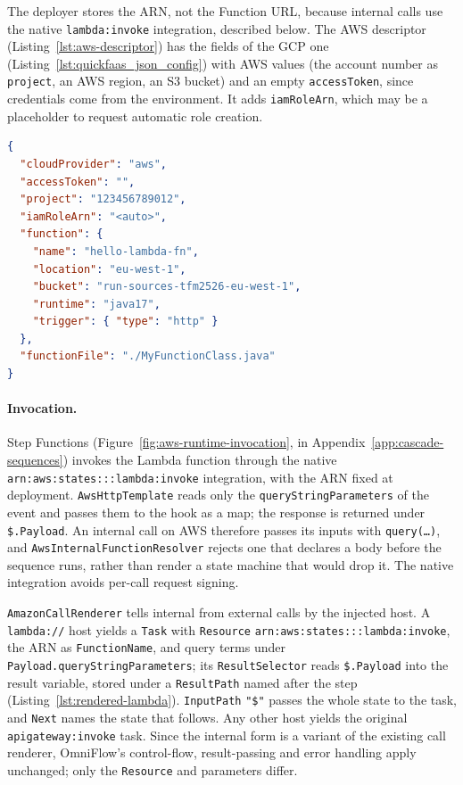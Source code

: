 The deployer stores the ARN, not the Function URL, because internal calls use the native
\texttt{lambda:invoke} integration, described below. The AWS descriptor
(Listing~\ref{lst:aws-descriptor}) has the fields of the GCP one
(Listing~\ref{lst:quickfaas_json_config}) with AWS values (the account number as
\texttt{project}, an AWS region, an S3 bucket) and an empty \texttt{accessToken}, since credentials
come from the environment. It adds \texttt{iamRoleArn}, which may be a placeholder to request
automatic role creation.

\begin{lstlisting}[language=json,caption={Minimal AWS deployment descriptor for an internal function.},label={lst:aws-descriptor}]
{
  "cloudProvider": "aws",
  "accessToken": "",
  "project": "123456789012",
  "iamRoleArn": "<auto>",
  "function": {
    "name": "hello-lambda-fn",
    "location": "eu-west-1",
    "bucket": "run-sources-tfm2526-eu-west-1",
    "runtime": "java17",
    "trigger": { "type": "http" }
  },
  "functionFile": "./MyFunctionClass.java"
}
\end{lstlisting}

\paragraph{Invocation.}
\label{sec:runtime-invocation}
Step Functions (Figure~\ref{fig:aws-runtime-invocation}, in Appendix~\ref{app:cascade-sequences})
invokes the Lambda function
through the native \texttt{arn:\allowbreak aws:\allowbreak states:::\allowbreak lambda:\allowbreak invoke} integration, with the ARN fixed at
deployment. \texttt{AwsHttpTemplate} reads only the \texttt{query\allowbreak String\allowbreak Parameters} of the event and
passes them to the hook as a map; the response is returned under \texttt{\$.Payload}. An internal
call on AWS therefore passes its inputs with \texttt{query(\ldots)}, and
\texttt{Aws\allowbreak Internal\allowbreak Function\allowbreak Resolver} rejects one that declares a
body before the sequence runs, rather than render a state machine that would drop it. The native
integration avoids per-call request signing.

\texttt{AmazonCall\allowbreak Renderer} tells internal from external calls by the injected host. A
\texttt{lambda://} host yields a \texttt{Task} with \texttt{Resource}
\texttt{arn:aws:states:::lambda:invoke}, the ARN as \texttt{FunctionName}, and query terms under
\texttt{Payload.queryStringParameters}; its \texttt{ResultSelector} reads \texttt{\$.Payload} into
the result variable, stored under a \texttt{ResultPath} named after the step
(Listing~\ref{lst:rendered-lambda}). \texttt{InputPath} \texttt{"\$"} passes the whole state to
the task, and \texttt{Next} names the state that follows. Any other host yields the original \texttt{apigateway:invoke}
task. Since the internal form is a variant of the existing call renderer, OmniFlow's control-flow,
result-passing and error handling apply unchanged; only the \texttt{Resource} and parameters differ.

